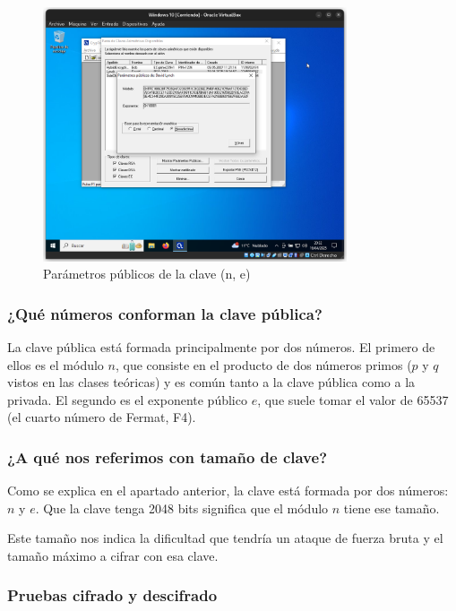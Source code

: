 \begin{figure}[H]
    \centering
    \includegraphics[width=0.8\textwidth]{ClavesRSA-02.png}
    \caption{Parámetros públicos de la clave (n, e)}
    \label{fig:RSA-public-params}
\end{figure}


\subsubsection{¿Qué números conforman la clave pública?}

La clave pública está formada principalmente por dos números. El primero de ellos es el módulo $n$, que consiste en el producto de dos números primos ($p$ y $q$ vistos en las clases teóricas) y es común tanto a la clave pública como a la privada. El segundo es el exponente público $e$, que suele tomar el valor de 65537 (el cuarto número de Fermat, F4).

\subsubsection{¿A qué nos referimos con tamaño de clave?}

Como se explica en el apartado anterior, la clave está formada por dos números: $n$ y $e$. Que la clave tenga 2048 bits significa que el módulo $n$ tiene ese tamaño.

Este tamaño nos indica la dificultad que tendría un ataque de fuerza bruta y el tamaño máximo a cifrar con esa clave. 


\subsubsection{Pruebas cifrado y descifrado}

